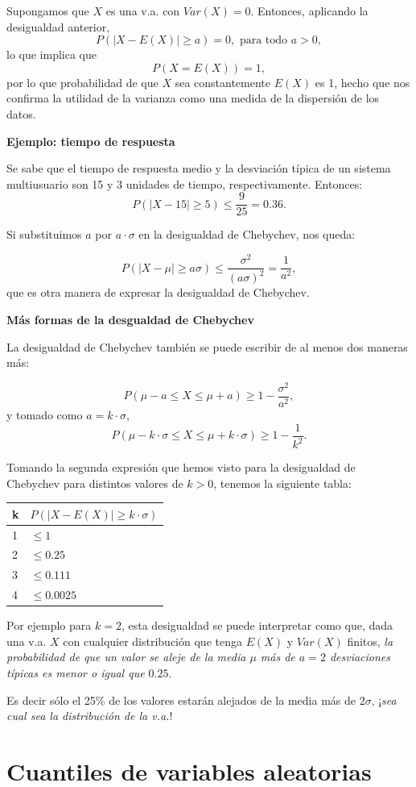 \documentclass[]{book}
\begin{document}
Supongamos que \(X\) es una v.a. con \(Var(X)=0\). Entonces, aplicando la desigualdad anterior,
\[P(|X-E(X)|\geq a )=0,\mbox{ para todo }a>0,\]
lo que implica que
\[P(X=E(X))=1,\]
por lo que probabilidad de que \(X\) sea
constantemente \(E(X)\) es 1, hecho que nos confirma la utilidad de la varianza como una
medida de la dispersión de los datos.

\textbf{Ejemplo: tiempo de respuesta}

Se sabe que el tiempo de respuesta medio y la desviación típica de un sistema multiusuario son 15 y 3 unidades de tiempo, respectivamente. Entonces:
\[
P(|X-15|\geq 5)\leq \frac9{25}=0.36.
\]

Si substituimos \(a\) por \(a\cdot \sigma\) en la
desigualdad de Chebychev, nos queda:

\[
P(|X-\mu|\geq a \sigma)\leq
\frac{\sigma^2}{(a\sigma)^2}=\frac1{a^2},
\]
que es otra manera de expresar la desigualdad de Chebychev.

\textbf{Más formas de la desgualdad de Chebychev}

La desigualdad de Chebychev también se puede escribir de al menos dos maneras más:

\[
P(\mu-a\leq X\leq \mu+a)\geq 1-\frac{\sigma^2}{a^2},
\]
y tomado como \(a=k\cdot \sigma\),
\[
P(\mu-k\cdot \sigma\leq X\leq \mu+ k \cdot \sigma)\geq 1-\frac1{k^2}.
\]

Tomando la segunda expresión que hemos visto para la desigualdad de
Chebychev para distintos valores de \(k>0\), tenemos la siguiente tabla:

\begin{longtable}[]{@{}ll@{}}
\toprule
k & \(P(|X-E(X)|\geq k \cdot \sigma)\)\tabularnewline
\midrule
\endhead
1 & \(\leq 1\)\tabularnewline
2 & \(\leq 0.25\)\tabularnewline
3 & \(\leq 0.111\)\tabularnewline
4 & \(\leq 0.0025\)\tabularnewline
\bottomrule
\end{longtable}

Por ejemplo para \(k=2\), esta desigualdad se puede interpretar como que, dada una v.a. \(X\) con cualquier distribución que tenga \(E(X)\) y \(Var(X)\) finitos, \emph{la probabilidad de que un valor se aleje de la media \(\mu\) más de \(a=2\) desviaciones típicas es menor o igual que \(0.25\)}.

Es decir sólo el 25\% de los valores estarán alejados de la media
más de \(2\sigma\), ¡\emph{sea cual sea la distribución de la v.a.}!

\hypertarget{cuantiles-de-variables-aleatorias}{%
\section{Cuantiles de variables aleatorias}\label{cuantiles-de-variables-aleatorias}}
\end{document}
